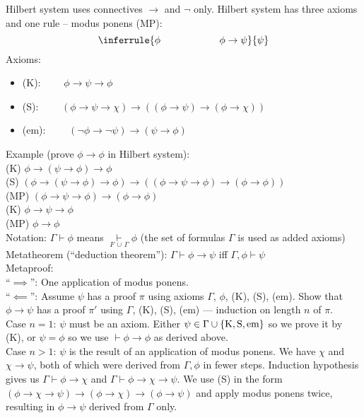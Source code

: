 {{Hilbert system uses connectives $\rightarrow$ and $\neg$ only.
Hilbert system has three axioms and one rule -- modus ponens (MP):
$$\inferrule
{\phi\qquad\qquad\qquad\phi\rightarrow\psi}
{\psi}
$$
Axioms:
\begin{itemize}
\item (K): $\qquad
\phi\rightarrow\psi\rightarrow\phi$
\item (S): $\qquad
(\phi\rightarrow\psi\rightarrow\chi)\rightarrow((\phi\rightarrow\psi)\rightarrow(\phi\rightarrow\chi))$
\item (em): $\qquad
(\neg\phi\rightarrow\neg\psi)\rightarrow(\psi\rightarrow\phi)$
\end{itemize}
Example (prove $\phi \rightarrow \phi$ in Hilbert system):\\
(K) $\phi \rightarrow (\psi \rightarrow \phi) \rightarrow \phi$\\
(S) $(\phi \rightarrow (\psi \rightarrow \phi) \rightarrow \phi) \rightarrow ((\phi \rightarrow \psi \rightarrow \phi) \rightarrow (\phi \rightarrow \phi))$\\
(MP) $(\phi \rightarrow \psi \rightarrow \phi) \rightarrow (\phi \rightarrow \phi)$\\
(K) $\phi \rightarrow \psi \rightarrow \phi$\\
(MP) $\phi \rightarrow \phi$\bigskip\\
Notation: $\Gamma \vdash \phi$ means $\underset{F \,\cup\, \Gamma}\vdash \phi$ (the set of formulas $\Gamma$ is used as added axioms)\\
Metatheorem (``deduction theorem''):
$\Gamma \vdash \phi \rightarrow \psi$ iff $\Gamma, \phi \vdash \psi$\\
Metaproof:\\
``$\implies$'': One application of modus ponens.\\
``$\impliedby$'':
Assume $\psi$ has a proof $\pi$ using axioms $\Gamma$, $\phi$, (K), (S), (em).
Show that $\phi \rightarrow \psi$ has a proof $\pi'$ using $\Gamma$, (K), (S), (em) --- induction on length $n$ of $\pi$.\\
Case $n=1$: $\psi$ must be an axiom.
Either $\psi \in \Gamma \cup \{\textup{K}, \textup{S}, \textup{em}\}$ so we prove it by (K),
or $\psi = \phi$ so we use $\vdash \phi \rightarrow \phi$ as derived above.\\
Case $n>1$: $\psi$ is the result of an application of modus ponens.
We have $\chi$ and $\chi \rightarrow \psi$, both of which were derived from $\Gamma, \phi$ in fewer steps.
Induction hypothesis gives us $\Gamma \vdash \phi \rightarrow \chi$ and $\Gamma \vdash \phi \rightarrow \chi \rightarrow \psi$.
We use (S) in the form $(\phi \rightarrow \chi \rightarrow \psi) \rightarrow (\phi \rightarrow \chi) \rightarrow (\phi \rightarrow \psi)$ and apply modus ponens twice,
resulting in $\phi \rightarrow \psi$ derived from $\Gamma$ only.

}} %
